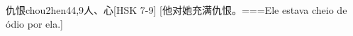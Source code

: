 \begin{EntryWithPhonetic}{仇恨}{chou2hen4}{4,9}{⼈、⼼}[HSK 7-9]
  [他对她充满仇恨。===Ele estava cheio de ódio por ela.]
\end{EntryWithPhonetic}
